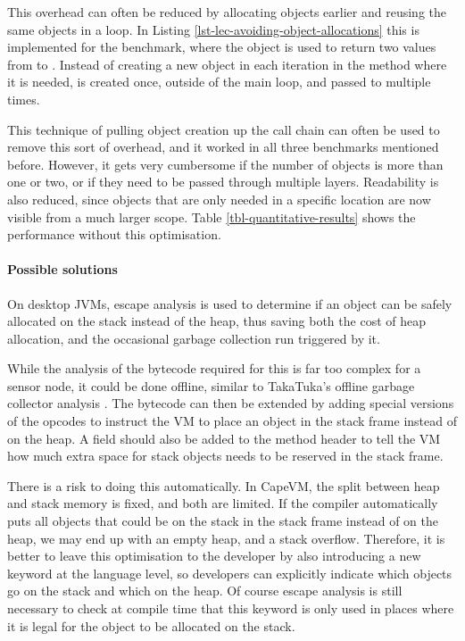 This overhead can often be reduced by allocating objects earlier and reusing the same objects in a loop. In Listing \ref{lst-lec-avoiding-object-allocations} this is implemented for the  benchmark, where the  object is used to return two values from  to . Instead of creating a new object in each iteration in the  method where it is needed,  is created once, outside of the main loop, and passed to  multiple times.

This technique of pulling object creation up the call chain can often be used to remove this sort of overhead, and it worked in all three benchmarks mentioned before. However, it gets very cumbersome if the number of objects is more than one or two, or if they need to be passed through multiple layers. Readability is also reduced, since objects that are only needed in a specific location are now visible from a much larger scope. Table \ref{tbl-quantitative-results} shows the performance without this optimisation.

\paragraph{Possible solutions}
On desktop JVMs, escape analysis \cite{Choi:1999uw, Goetz:2005uy} is used to determine if an object can be safely allocated on the stack instead of the heap, thus saving both the cost of heap allocation, and the occasional garbage collection run triggered by it.

While the analysis of the bytecode required for this is far too complex for a sensor node, it could be done offline, similar to TakaTuka's offline garbage collector analysis \cite{Aslam:2011thesis}. The bytecode can then be extended by adding special versions of the  opcodes to instruct the VM to place an object in the stack frame instead of on the heap. A field should also be added to the method header to tell the VM how much extra space for stack objects needs to be reserved in the stack frame.

There is a risk to doing this automatically. In CapeVM, the split between heap and stack memory is fixed, and both are limited. If the compiler automatically puts all objects that could be on the stack in the stack frame instead of on the heap, we may end up with an empty heap, and a stack overflow. Therefore, it is better to leave this optimisation to the developer by also introducing a new keyword at the language level, so developers can explicitly indicate which objects go on the stack and which on the heap. Of course escape analysis is still necessary to check at compile time that this keyword is only used in places where it is legal for the object to be allocated on the stack.





